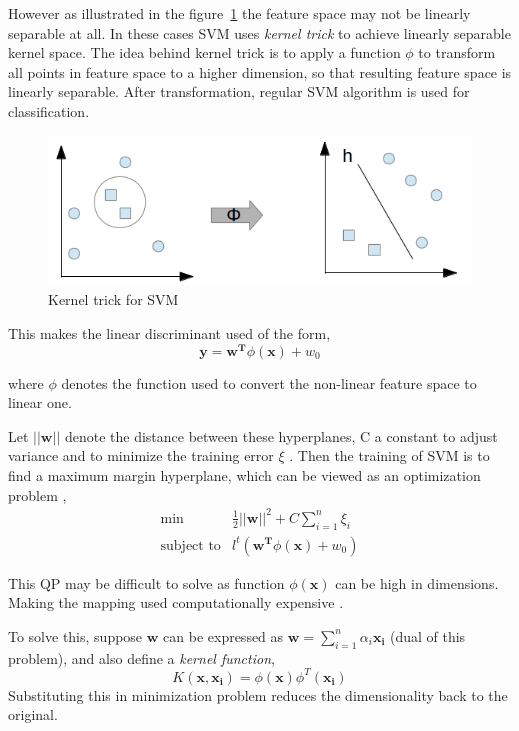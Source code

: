 However as illustrated in the figure~\ref{fig:svm2} the feature space may not be linearly separable at all. In these cases SVM uses \emph{kernel trick} to achieve linearly separable kernel space. The idea behind kernel trick is to apply a function $\phi$ to transform all points in feature space to a higher dimension, so that resulting feature space is linearly separable. After transformation, regular SVM algorithm is used for classification.

\begin{figure}[h]
  \begin{center}
    \captionsetup{justification=centering}
    \includegraphics[scale=0.50]{figures/svm2.png}
    \caption{Kernel trick for SVM}
    \label{fig:svm2}
  \end{center}
\end{figure}

This makes the linear discriminant used of the form,
\[\boldsymbol{y} = \boldsymbol{w^T}\phi(\boldsymbol{x}) + w_0 \]

where $\phi$ denotes the function used to convert the non-linear feature space to linear one.

Let $||\boldsymbol{w}||$ denote the distance between these hyperplanes, C a constant to adjust variance and to minimize the training error $\xi$ . Then the training of SVM is to find a maximum margin hyperplane, which can be viewed as an optimization problem \cite{Vapnik1995, Chang2011},
\[\begin{array}{ll} 
 \min &\frac{1}{2} ||\boldsymbol{w}||^2 + C \sum\limits_{i=1}^n \xi_i \\
 \mbox{subject to} & l^t(\boldsymbol{w^T}\phi(\boldsymbol{x}) + w_0) 
\end{array}\]

This QP may be difficult to solve as function $\phi(\boldsymbol{x})$ can be high in dimensions. Making the mapping used computationally expensive \cite{Ben-Hur2010}.

To solve this, suppose $\boldsymbol{w}$ can be expressed as $\boldsymbol{w} = \sum\limits_{i=1}^n \alpha_i\boldsymbol{x_i}$ (dual of this problem), and also define a \emph{kernel function},
\[K(\boldsymbol{x},\boldsymbol{x_i}) = \phi(\boldsymbol{x})\phi^T(\boldsymbol{x_i})\]
 Substituting this in minimization problem reduces the dimensionality back to the original.

